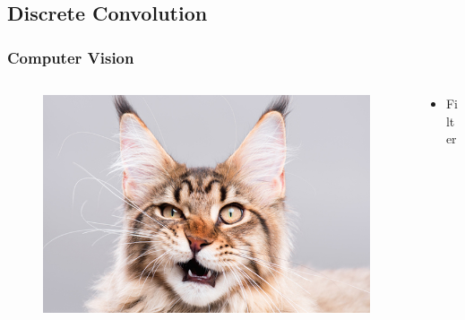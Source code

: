 \documentclass[aspectratio=169]{beamer}
\newcommand\imageright[1]{ %
    \caption*{\scalebox{.5}{\textcolor{lightgray}{\textcopyright~#1}}} %
}
\begin{document}
\subsection{Discrete Convolution}
\label{subsec:discrete-convolution}

\begin{frame}
\frametitle{Computer Vision}

\begin{columns}
    \begin{column}{0.48\textwidth}
        \begin{figure}
            \centering
            \includegraphics[width=\linewidth]{cat.jpg}
            \imageright{Catster}
        \end{figure}
    \end{column}
    \begin{column}{0.48\textwidth}
        \begin{itemize}
            \item Filter
        \end{itemize}
    \end{column}
\end{columns}
\end{frame}
\end{document}
